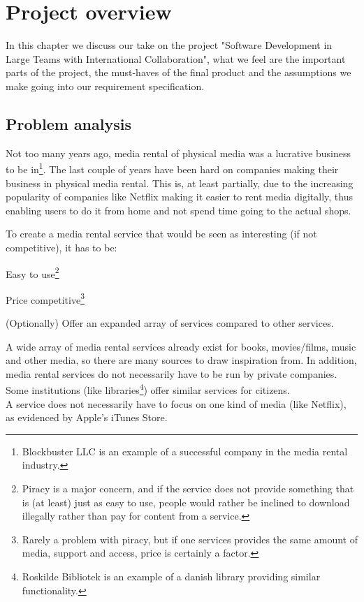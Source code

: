 \chapter{Project overview}
\label{Overview}
In this chapter we discuss our take on the project "Software Development in Large Teams with International Collaboration", what we feel are the important parts of the project, the must-haves of the final product and the assumptions we make going into our requirement specification.
\section{Problem analysis}
\label{Overview_analysis}
Not too many years ago, media rental of physical media was a lucrative business to be in\footnote{Blockbuster LLC\cite{Block-wiki} is an example of a successful company in the media rental industry.}. The last couple of years have been hard on companies making their business in physical media rental\cite{Block-loss}. This is, at least partially, due to the increasing popularity of companies like Netflix\cite{Netflix-wiki} making it easier to rent media digitally, thus enabling users to do it from home and not spend time going to the actual shops.

To create a media rental service that would be seen as interesting (if not competitive), it has to be:
\begin{my_itemize}
\item Easy to use\footnote{Piracy is a major concern, and if the service does not provide something that is (at least) just as easy to use, people would rather be inclined to download illegally rather than pay for content from a service\cite{GN-interview}.}
\item Price competitive\footnote{Rarely a problem with piracy, but if one services provides the same amount of media, support and access, price is certainly a factor.}
\item (Optionally) Offer an expanded array of services compared to other services.
\end{my_itemize}

A wide array of media rental services already exist for books, movies/films, music and other media, so there are many sources to draw inspiration from. In addition, media rental services do not necessarily have to be run by private companies. Some institutions (like libraries\footnote{Roskilde Bibliotek is an example of a danish library providing similar functionality\cite{rosbib}.}) offer similar services for citizens.\\
A service does not necessarily have to focus on one kind of media (like Netflix), as evidenced by Apple's iTunes Store\cite{ITstore}. 

